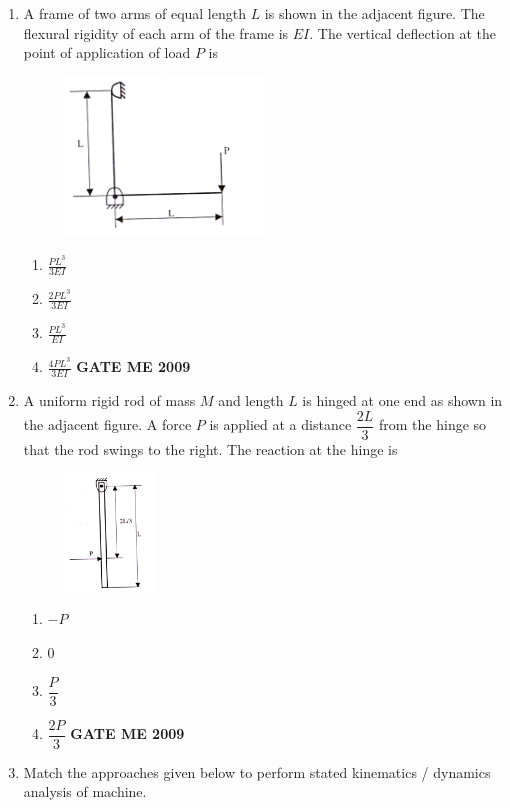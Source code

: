 \documentclass[journal]{IEEEtran}
\begin{document}
\begin{enumerate}[leftmargin=0pt]
\item A frame of two arms of equal length $L$ is shown in the adjacent figure. The flexural rigidity of each arm of the frame is $EI$. The vertical deflection at the point of application of load $P$ is
\begin{figure}[h]
  \centering
  \includegraphics[width=0.5\textwidth]{Figs/image (9).png}
  \caption{}
\end{figure}

\begin{enumerate}[label=(\Alph*)]
  \item $\frac{PL^3}{3EI}$
  \item $\frac{2PL^3}{3EI}$
  \item $\frac{PL^3}{EI}$
  \item $\frac{4PL^3}{3EI}$
\hfill{\textbf{GATE ME 2009}}
\end{enumerate}





\item A uniform rigid rod of mass $M$ and length $L$ is hinged at one end as shown in the adjacent figure. A force $P$ is applied at a distance $\dfrac{2L}{3}$ from the hinge so that the rod swings to the right. The reaction at the hinge is
\begin{figure}[h]
  \centering
  \includegraphics[width=0.23\textwidth]{Figs/image (10).png}
  \caption{}
\end{figure}
\begin{enumerate}[label=(\Alph*)]
  \item $-P$
  \item $0$
  \item $\dfrac{P}{3}$
  \item $\dfrac{2P}{3}$
\hfill{\textbf{GATE ME 2009}}
\end{enumerate}
\item Match the approaches given below to perform stated kinematics / dynamics analysis of machine.\\
\begin{table}[h]
    \centering
    
\end{table}\\


\end{enumerate}
\end{document}

